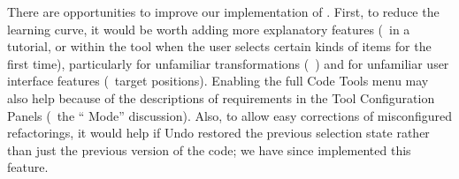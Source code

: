 
There are opportunities to improve our implementation of \deuce{}.
First, to reduce the learning curve, it would be worth adding more explanatory
features (\eg{}~in a tutorial, or within the tool when the user selects certain
kinds of items for the first time), particularly for unfamiliar transformations
(\eg{}~) and for unfamiliar user interface features
(\ie{}~target positions). Enabling the full Code Tools menu may also help
because of the descriptions of requirements in the Tool Configuration Panels
(\cf{}~the ``\deuce{} Mode'' discussion). Also, to allow easy corrections of
misconfigured refactorings, it would help if
Undo restored the previous selection state rather than just the previous version of
the code; we have since implemented this feature.
